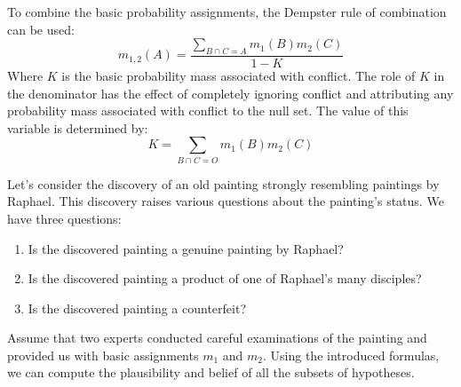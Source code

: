 \documentclass[12pt, a4paper]{report}
\begin{document}
    To combine the basic probability assignments, the Dempster rule of combination can be used:
    \[m_{1,2}(A)=\dfrac{\sum_{B \cap C=A}m_1(B)m_2(C)}{1-K}\]
    Where $K$ is the basic probability mass associated with conflict. 
    The role of $K$ in the denominator has the effect of completely ignoring conflict and attributing any probability mass associated with conflict to the null set. 
    The value of this variable is determined by:
    \[K=\sum_{B \cap C=O}m_1(B)m_2(C)\]
    \begin{example}
        Let's consider the discovery of an old painting strongly resembling paintings by Raphael. 
        This discovery raises various questions about the painting's status. 
        We have three questions:
        \begin{enumerate}
            \item Is the discovered painting a genuine painting by Raphael?
            \item Is the discovered painting a product of one of Raphael's many disciples?
            \item Is the discovered painting a counterfeit?
        \end{enumerate}
        Assume that two experts conducted careful examinations of the painting and provided us with basic assignments $m_1$ and $m_2$. 
        Using the introduced formulas, we can compute the plausibility and belief of all the subsets of hypotheses.
    \end{example}
\end{document}
